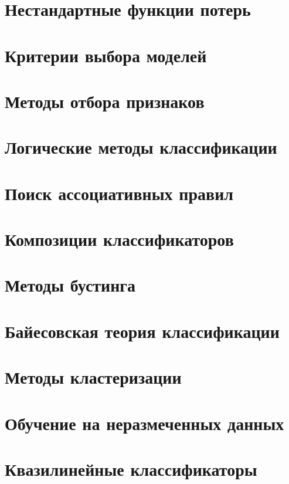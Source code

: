 \documentclass{mybook}
\theoremstyle{definition}
\theoremstyle{definition}
\theoremstyle{definition}
\theoremstyle{remark}
\theoremstyle{remark}
\begin{document}
    \chapter{Нестандартные функции потерь}
    

    \clearpage
    \chapter{Критерии выбора моделей}
    

    \clearpage
    \chapter{Методы отбора признаков}
    

    \clearpage
    \chapter{Логические методы классификации}
    

    \clearpage
    \chapter{Поиск ассоциативных правил}
    

    \clearpage
    \chapter{Композиции классификаторов}
    

    \clearpage
    \chapter{Методы бустинга}
    

    \clearpage
    \chapter{Байесовская теория классификации}
    

    \clearpage
    \chapter{Методы кластеризации}
    

    \clearpage
    \chapter{Обучение на неразмеченных данных}
    

    \clearpage
    \chapter{Квазилинейные классификаторы}
    


    \clearpage
    \printbibliography
\end{document}
